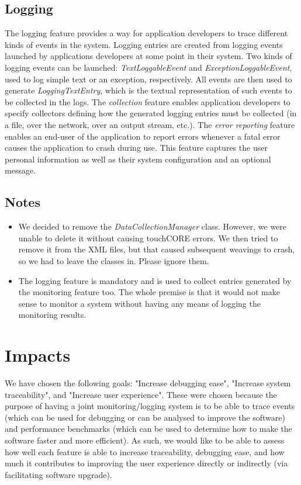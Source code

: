 \documentclass[paper=letter, fontsize=12pt]{scrartcl} %
\numberwithin{equation}{section} %
\numberwithin{figure}{section} %
\numberwithin{table}{section} %
\begin{document}
\subsection{Logging}
\hspace*{.5cm} The logging feature provides a way for application developers to trace different kinds of events in the system. Logging entries are created from logging events launched by applications developers at some point in their system. Two kinds of logging events can be launched: \textit{TextLoggableEvent} and \textit{ExceptionLoggableEvent}, used to log simple text or an exception, respectively. All events are then used to generate \textit{LoggingTextEntry}, which is the textual representation of such events to be collected in the logs. The \textit{collection} feature enables application developers to specify collectors defining how the generated logging entries must be collected (in a file, over the network, over an output stream, etc.). The \textit{error reporting} feature enables an end-user of the application to report errors whenever a fatal error causes the application to crash during use. This feature captures the user personal information as well as their system configuration and an optional message.


\subsection{Notes}
\begin{itemize}
\item We decided to remove the \textit{DataCollectionManager} class. However, we were unable to delete it without causing touchCORE errors. We then tried to remove it from the XML files, but that caused subsequent weavings to crash, so we had to leave the classes in. Please ignore them.
\item The logging feature is mandatory and is used to collect entries generated by the monitoring feature too. The whole premise is that it would not make sense to monitor a system without having any means of logging the monitoring results.
\end{itemize}

\newpage
\section{Impacts}
\hspace*{.5cm} We have chosen the following goals: "Increase debugging ease", "Increase system traceability", and "Increase user experience". These were chosen because the purpose of having a joint monitoring/logging system is to be able to trace events (which can be used for debugging or can be analysed to improve the software) and performance benchmarks (which can be used to determine how to make the software faster and more efficient). As such, we would like to be able to assess how well each feature is able to increase traceability, debugging ease, and how much it contributes to improving the user experience directly or indirectly (via facilitating software upgrade).
\end{document}
